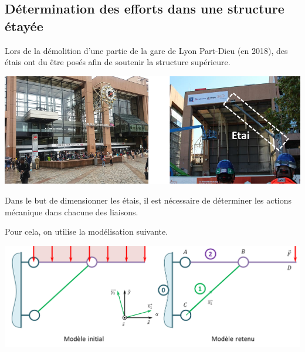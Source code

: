 \documentclass[10pt,fleqn]{article} %
\begin{document}
\begin{multicols}{2}
\begin{multicols}{2}
\noindent\footnotesize
{}
\normalsize

\ifprof
\newpage
\else
\fi

\section*{Détermination des efforts dans une structure étayée}
\setcounter{exo}{0}
\ifprof
\else
Lors de la démolition d'une partie de la gare de Lyon Part-Dieu (en 2018), des étais ont du être posés afin de soutenir la structure supérieure. 

\begin{center}
\includegraphics[width=\linewidth]{images/fig_03}
\end{center}

Dans le but de dimensionner les étais, il est nécessaire de déterminer les actions mécanique dans chacune des liaisons. 

Pour cela, on utilise la modélisation suivante. 

\begin{center}
\includegraphics[width=\linewidth]{images/fig_04}
\end{center}


\end{multicols}
\end{multicols}
\end{document}
